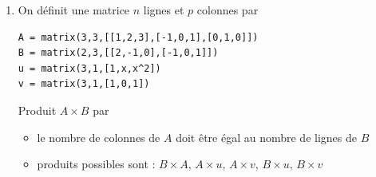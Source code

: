 \begin{frame}[fragile]
\begin{enumerate}
  \item On définit une matrice $n$ lignes et $p$ colonnes par  \\
  \centerline{}
  
  \pause
\begin{algo}
\begin{lstlisting}
A = matrix(3,3,[[1,2,3],[-1,0,1],[0,1,0]])
B = matrix(2,3,[[2,-1,0],[-1,0,1]])
u = matrix(3,1,[1,x,x^2])
v = matrix(3,1,[1,0,1])
\end{lstlisting}
\end{algo}
 
 
\bigskip
  \pause
  
  Produit $A\times B$ par 
  \pause
  
  \begin{itemize}
    \item le nombre de colonnes de $A$ doit être égal au nombre de lignes de $B$
    \pause
    \item produits possibles sont : 
  $B\times A$, $A \times u$, $A \times v$,  $B \times u$, $B \times v$
  \end{itemize}

\end{enumerate}  
\end{frame}


